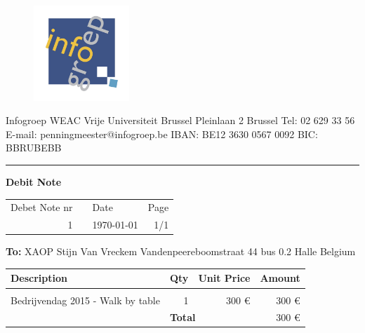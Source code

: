\documentclass{letter}
\begin{document}
\begin{figure}
  \begin{center}
    \includegraphics[width=0.32\textwidth]{invoices/ig.jpg}
  \end{center}
\end{figure}

Infogroep
\newline
WEAC
\newline
Vrije Universiteit Brussel
\newline
Pleinlaan 2 
 Brussel
\newline
\newline
Tel: 02 629 33 56
\newline
E-mail: penningmeester@infogroep.be
\newline
\newline
IBAN: BE12 3630 0567 0092
\newline
BIC: BBRUBEBB

\rule{\textwidth}{1pt}
\newline


\textbf{\huge{
Debit Note
}}

\begin{tabular}{ r p{10cm} l r}
	Debet Note nr & & Date & Page \\
	1 & & \today & 1/1 \\
\end{tabular} 
\vspace{1cm}


\textbf{To:}
\newline
XAOP
\newline
Stijn Van Vreckem
\newline
Vandenpeereboomstraat 44 bus 0.2
 Halle
\newline
Belgium




\begin{tabular}{ |p{12cm} | r | r | r |}
	\hline
	\rowcolor{lightgray}
	Description & Qty & Unit Price & Amount \\ [2pt]
	\hline
	&&&\\
	Bedrijvendag 2015 - Walk by table & 1 & 300 \euro & 300  \euro \\[8cm]
	
	\hline
	
	 \multicolumn{1}{c}{}& \multicolumn{2}{|l|}{\cellcolor{lightgray} \textbf{Total}} & 300 \euro\\[2pt]
	\cline{2-4}
	
\end{tabular} 
\end{document}
